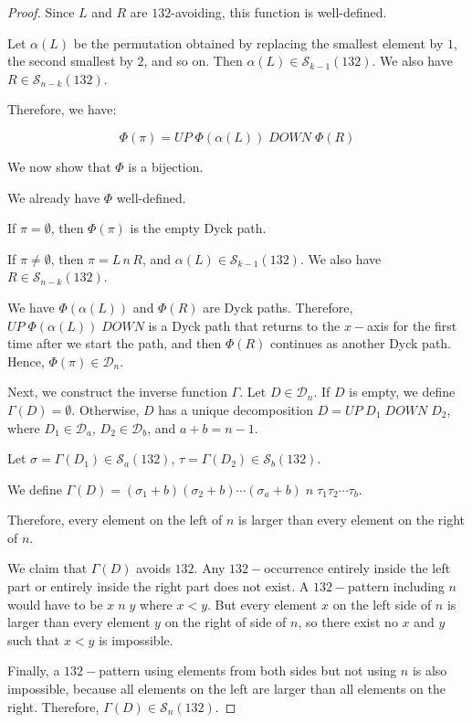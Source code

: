 \documentclass[12pt]{article}
\begin{document}
\begin{proof}
Since $L$ and $R$ are $132$-avoiding, this function is well-defined.

Let $\alpha(L)$ be the permutation obtained by replacing the smallest element by $1$, the second smallest by $2$, and so on. Then $\alpha(L) \in \mathcal{S}_{k-1}(132)$. We also have $R \in \mathcal{S}_{n-k}(132)$.

Therefore, we have:

$$\Phi(\pi)=UP\;\Phi(\alpha(L))\;DOWN\;\Phi(R)$$

We now show that $\Phi$ is a bijection.

We already have $\Phi$ well-defined. 

If $\pi=\emptyset$, then $\Phi(\pi)$ is the empty Dyck path.

If $\pi\neq \emptyset$, then $\pi=L\,n\,R$, and $\alpha(L) \in \mathcal{S}_{k-1}(132)$. We also have $R \in \mathcal{S}_{n-k}(132)$.

We have $\Phi(\alpha(L))$ and $\Phi(R)$ are Dyck paths. Therefore, $UP\;\Phi(\alpha(L))\;DOWN$
is a Dyck path that returns to the $x-$axis for the first time after we start the path, and then $\Phi(R)$ continues as another Dyck path. Hence, $\Phi(\pi)\in \mathcal{D}_n$.

Next, we construct the inverse function $\Gamma$. Let $D\in\mathcal{D}_n$. If $D$ is empty, we define $\Gamma(D)=\emptyset$. Otherwise, $D$ has a unique decomposition $D=UP\;D_1\;DOWN\;D_2$, where $D_1\in\mathcal{D}_a$, $D_2\in\mathcal{D}_b$, and $a+b=n-1$.

Let $\sigma=\Gamma(D_1)\in \mathcal{S}_a(132)$, $\tau=\Gamma(D_2)\in \mathcal{S}_b(132)$.

We define $\Gamma(D) = (\sigma_1+b)(\sigma_2+b)\cdots(\sigma_a+b)\; n\; \tau_1\tau_2\cdots\tau_b.$

Therefore, every element on the left of $n$ is larger than every element on the right of $n$.

We claim that $\Gamma(D)$ avoids $132$. Any $132-$occurrence entirely inside the left part or entirely inside the right part does not exist. A $132-$pattern including $n$ would have to be $x\;n\;y$ where $x < y$. But every element $x$ on the left side of $n$ is larger than every element $y$ on the right of side of $n$, so there exist no $x$ and $y$ such that $x<y$ is impossible. 

Finally, a $132-$pattern using
elements from both sides but not using $n$ is also impossible, because all elements on the
left are larger than all elements on the right. Therefore, $\Gamma(D)\in \mathcal{S}_n(132).$


\end{proof}
\end{document}

